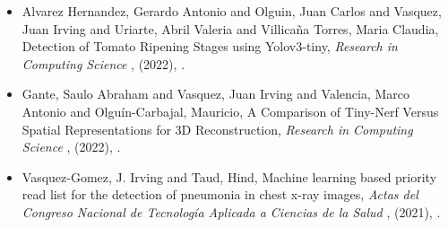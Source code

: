 \begin{itemize} 
\item Alvarez Hernandez, Gerardo Antonio and Olguin, Juan Carlos and Vasquez, Juan Irving and Uriarte, Abril Valeria and Villicaña Torres, Maria Claudia, Detection of Tomato Ripening Stages using Yolov3-tiny, \textit{ Research in Computing Science }, (2022), \href{https://rcs.cic.ipn.mx/2022_151_10/Detection%20of%20Tomato%20Ripening%20Stages%20using%20Yolov3-tiny.pdf}{\faExternalLink}.
\item Gante, Saulo Abraham and Vasquez, Juan Irving and Valencia, Marco Antonio and Olguín-Carbajal, Mauricio, A Comparison of Tiny-Nerf Versus Spatial Representations for 3D Reconstruction, \textit{ Research in Computing Science }, (2022), \href{https://rcs.cic.ipn.mx/2022_151_10/A%20Comparison%20of%20Tiny-Nerf%20Versus%20Spatial%20Representations%20for%203D%20Reconstruction.pdf}{\faExternalLink}.
\item Vasquez-Gomez, J. Irving and Taud, Hind, Machine learning based priority read list for the detection of pneumonia in chest x-ray images, \textit{ Actas del Congreso Nacional de Tecnología Aplicada a Ciencias de la Salud }, (2021), \href{https://www-optica.inaoep.mx/~tecnologia_salud/acontacs/articulos/2021/MyT2021-033-Machine_learning_based_priority_read_list_for_the_detection_of_pneumonia_in%20chest_x-ray_images.pdf}{\faExternalLink}.
\end{itemize} 
